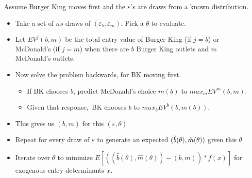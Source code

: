 \documentclass[notes=show]{beamer}
\begin{document}
\begin{frame}%


Assume Burger King moves first and the $\varepsilon $'s are draws from a
known distribution.

\begin{itemize}
\item Take a set of $ns$ draws of $(\varepsilon _{b},\varepsilon _{m})$.
Pick a $\theta $ to evaluate.

\item Let $EV^{j}(b,m)$ be the total entry value of Burger King (if $j=b$)
or McDonald's (if $j=m$) when there are $b$ Burger King outlets and $m$
McDonald's outlets.

\item Now solve the problem backwards, for BK moving first.

\begin{itemize}
\item If BK chooses $b$, predict McDonald's choice $m(b)$ to $%
max_{m}EV^{m}(b,m)$.

\item Given that response,\ BK chooses $b$ to $max_{b}EV^{b}(b,m(b))$.
\end{itemize}

\item This gives us $(b,m)$ for this $(\varepsilon ,\theta )$

\item Repeat for every draw of $\varepsilon $ to generate an expected $(\hat{%
b}(\theta ),\hat{m}(\theta ))$ given this $\theta $

\item Iterate over $\theta $ to minimize $E[((\hat{b}(\theta ),\hat{m}%
(\theta ))-(b,m))\ast f(x)]$ for exogenous entry determinants $x$.
\end{itemize}

\end{frame}%
\end{document}
